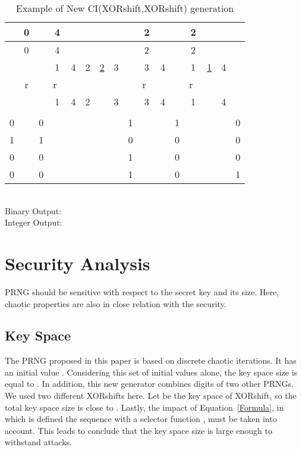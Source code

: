 \documentclass[journal]{IEEEtran}
\begin{document}
\begin{table*}[!t]
\centering
\begin{tabular}{|c|cc|cccccc|ccc|cccc|}
\hline
 &0 & &4 & & & & & &2& &&2&&  &  \\ \hline
 &0 & &4 & & & & & &2& &&2&&  &  \\ \hline
  &  & &1 &4&2&\underline{2}       &3& &3&4&&1&\underline{1}      &4&\\ \hline
  &r  & &r~ &  &  & &  && r~ & &&r~ & &  &  \\ \hline
  &  & &1 &4&2&        &3& &3&4&&1& &4 &  \\ \hline
 &  & & & &  
&  & & & & &   
& & &&  \\
0 & &0 & & &
 & &   &1   & & &
1 & & & & 0\\
1 &  &1 &   &   &
 & & &0 & & &
0 & &  &&0\\
0 & &0 & & &
 & & &1 & & &
0 &   & & &0  \\
0 & &0  & & &
 & & &1 & & &
0 & & &&1 \\
\hline
\end{tabular}\\
\vspace{0.5cm}
Binary Output: \\
Integer Output:

\caption{Example of New CI(XORshift,XORshift) generation}
\label{table application example}
\end{table*}




\section{Security Analysis}
\label{Security analysis}
PRNG should be sensitive with respect to the secret key and its size. Here, chaotic properties are also in close relation with the security.



\subsection{Key Space}

The PRNG proposed in this paper is based on discrete chaotic iterations. It has an initial
value . Considering this set of initial values alone, the key space size
is equal to . In addition, this new generator combines digits of two other PRNGs. We used two different XORshifts here. Let  be the key space of XORshift, so the total key space
size is close to . Lastly, the impact of Equation~\ref{Formula}, in which is defined the  sequence with a selector function , must be
taken into account. This leads to conclude that the key space size is large enough to withstand
attacks.
\end{document}
